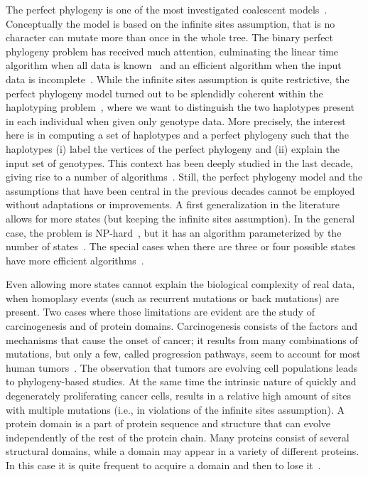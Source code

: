The perfect phylogeny is one of the most investigated coalescent models~\cite{Gusfield}.
Conceptually the  model is based on the infinite sites assumption, that is no
character can mutate more than once in the whole tree.
The binary perfect phylogeny problem has received much attention, culminating
the linear time algorithm when all data is known~\cite{Gus91} and an efficient
algorithm when the input data is incomplete~\cite{Sha}.
While the infinite sites assumption is quite restrictive, the perfect phylogeny model
turned out to be splendidly coherent within the haplotyping problem~\cite{bo4,Gus02}, where we want to distinguish the two
haplotypes present in each individual when given only genotype data.
More precisely, the interest here is in computing a set of haplotypes and a perfect phylogeny such that the haplotypes
(i) label the vertices of the perfect phylogeny and (ii) explain the input set of genotypes.
This context has been deeply studied in the last decade, giving rise to a number of   algorithms~\cite{Boniz,Gus06}.
%
Still, the perfect phylogeny model and the assumptions that have been central in
the previous decades cannot be employed without adaptations or improvements.
A first generalization in the literature allows for more states
(but keeping the infinite sites assumption).
In the general case, the problem is NP-hard~\cite{BFW92}, but it has
an algorithm parameterized by the number of
states~\cite{DBLP:journals-siamcomp-Fernandez-BacaL03,kannan1997fast}.
The special cases when there are three or four possible states have more
efficient algorithms~\cite{dress1992convex,kannan1994inferring,gysel2012constructing}.


Even allowing more states cannot explain the biological complexity of
real data, when homoplasy events (such as recurrent mutations or back
mutations) are present.
Two cases where those limitations are evident are the study of carcinogenesis
and of protein domains.
Carcinogenesis consists of the factors
and mechanisms that cause the onset of cancer; it
results from many combinations of mutations, but only a few, called progression
pathways, seem to account for most human tumors~\cite{subramanian2012inference}.
The observation that tumors are evolving cell populations leads to phylogeny-based
studies. At the same time the intrinsic nature of quickly and degenerately
proliferating cancer cells, results in a relative high amount of sites with
multiple mutations (i.e., in violations of the infinite sites assumption).
A protein domain is
a part of protein sequence and structure that can evolve independently of the
rest of the protein chain. Many proteins consist of several structural
domains, while a domain may appear in a variety of different proteins. In this case
it is quite frequent to acquire a domain and then to lose it~\cite{przytycka2006graph}.

